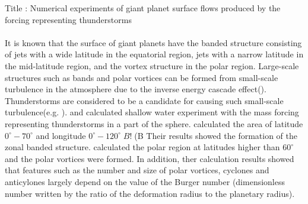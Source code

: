 \documentclass[a4j,12pt,openbib,oneside]{jreport}
\begin{document}
Title : Numerical experiments of giant planet surface flows 
produced by the forcing representing thunderstorms
%
\\
\\
\quad 
It is known that the surface of giant planets have
the banded structure consisting of jets with a wide latitude in the equatorial region, 
jets with a narrow latitude in the mid-latitude region, 
and the vortex structure in the polar region.
%
Large-scale structures such as bands and polar vortices 
can be formed from small-scale turbulence in the atmosphere 
due to the inverse energy cascade effect(\cite{Vallis2017}). 
Thunderstorms are considered to be 
a candidate for causing such small-scale turbulence(e.g. \cite{Ingersoll2000}).
%
\cite{Showman2007} and \cite{Brueshaber2019} calculated 
shallow water experiment with the mass forcing representing thunderstorms 
in a part of the sphere.
%
%
\cite{Showman2007} calculated the area of latitude $0^\circ - 70^\circ$ and
longitude $0^\circ - 120^\circ$$B!$(B
Their results showed the formation of the zonal banded structure.
%
\cite{Brueshaber2019} calculated the polar region at latitudes higher than $60^\circ$ 
and the polar vortices were formed.
%
In addition, ther calculation results showed 
that features such as the number and size of polar vortices,
cyclones and anticylones largely depend on 
the value of the Burger number (dimensionless number written 
by the ratio of the deformation radius to the planetary radius).
\end{document}
